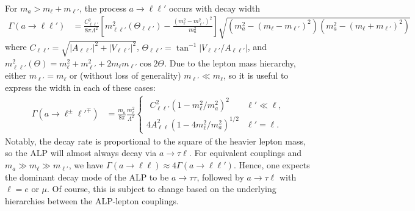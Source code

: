 For $m_a > m_\ell + m_{\ell'}$, the process $a \rightarrow \ell \ell'$ occurs with decay width
\begin{align}
    \Gamma(a \rightarrow \ell\ell') &= \frac{C_{\ell\ell'}^2}{8\pi \Lambda^2}\left[m_{\ell\ell'}^2(\Theta_{\ell\ell'}) - \frac{(m_\ell^2-m_{\ell'}^2)^2}{m_a^2}\right]\sqrt{\left(m_a^2-(m_\ell-m_{\ell'})^2\right)\left(m_a^2-(m_\ell+m_{\ell'})^2\right)}
\end{align}
where $C_{\ell\ell'} = \sqrt{|A_{\ell \ell'}|^2 + |V_{\ell \ell'}|^2}$, $\Theta_{\ell\ell'} = \tan^{-1}\left|V_{\ell\ell'}/A_{\ell\ell'}\right|$, and $m_{\ell\ell'}^2(\Theta) = m_\ell^2 + m_{\ell'}^2 + 2m_\ell m_{\ell'}\cos{2\Theta}$. Due to the lepton mass hierarchy, either $m_{\ell'} = m_\ell$ or (without loss of generality) $m_{\ell'} \ll m_\ell$, so it is useful to express the width in each of these cases: 
\begin{align}
    \Gamma(a \rightarrow \ell^\pm \ell'^\mp) &= \frac{m_a}{8\pi}\frac{m_\ell^2}{\Lambda^2}\begin{cases}  \ \,C_{\ell\ell'}^2(1 - m_{\ell}^2/m_a^2)^2& \ell' \ll \ell,\\
    4A_{\ell\ell}^2(1 - 4m_\ell^2/m_a^2)^{1/2} & \ell' = \ell.
    \end{cases}
\end{align}
Notably, the decay rate is proportional to the square of the heavier lepton mass, so the ALP will almost always decay via $a\rightarrow \tau \ell$. For equivalent couplings and $m_a \gg m_\ell \gg m_{\ell'}$, we have $\Gamma(a\rightarrow \ell \ell)\approx 4\Gamma(a\rightarrow \ell \ell')$. Hence, one expects the dominant decay mode of the ALP to be $a\rightarrow \tau\tau$, followed by $a \rightarrow \tau \ell$ with $\ell = e$ or $\mu$. Of course, this is subject to change based on the underlying hierarchies between the ALP-lepton couplings.

